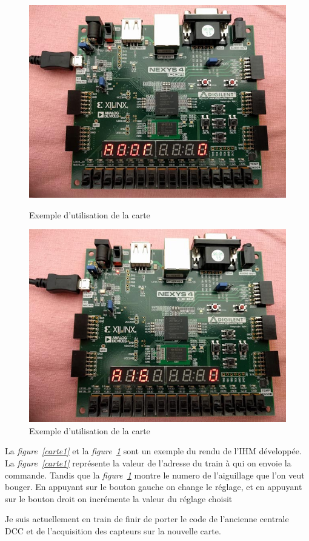 \begin{figure}[h]
    \begin{minipage}[c]{.46\linewidth}
        \centering
        \includegraphics[scale=0.3]{exe_add.jpg}
        \caption{Exemple d'utilisation de la carte}
        \label{carte1}
    \end{minipage}
    \hfill%
    \begin{minipage}[c]{.46\linewidth}
        \centering
        \includegraphics[scale=0.3]{exe_aigui.jpg}
        \caption{Exemple d'utilisation de la carte}
        \label{carte2}
    \end{minipage}
\end{figure}

La \emph{figure~\ref{carte1}} et la \emph{figure~\ref{carte2}} sont un
exemple du rendu de l'IHM d\'evelopp\'ee.
La \emph{figure~\ref{carte1}} représente la valeur de l'adresse du
train à qui on envoie la commande.
Tandis que la \emph{figure~\ref{carte2}} montre le numero de
l'aiguillage que l'on veut bouger.
En appuyant sur le bouton gauche on change le réglage, et en appuyant sur le
bouton droit on incrémente la valeur du réglage choisit


Je suis actuellement en train de finir de porter le code de l'ancienne
centrale DCC et de l'acquisition des capteurs sur la nouvelle carte.

\newpage





